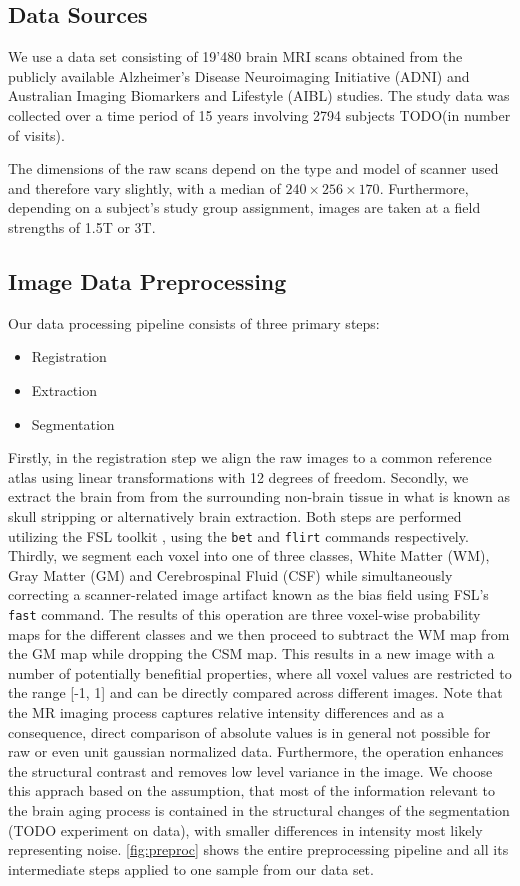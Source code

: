 \subsection{Data Sources}
We use a data set consisting of 19'480 brain MRI scans obtained from the publicly available Alzheimer's Disease Neuroimaging Initiative (ADNI) \cite{ADNI} and Australian Imaging Biomarkers and Lifestyle (AIBL) \cite{AIBL} studies. The study data was collected over a time period of 15 years involving 2794 subjects TODO(in number of visits).

The dimensions of the raw scans depend on the type and model of scanner used and therefore vary slightly, with a median of $ 240 \times 256 \times 170 $. Furthermore, depending on a subject's study group assignment, images are taken at a field strengths of 1.5T or 3T.
\subsection{Image Data Preprocessing}
Our data processing pipeline consists of three primary steps:

\begin{itemize}
\item Registration
\item Extraction
\item Segmentation
\end{itemize}

Firstly, in the registration step we align the raw images to a common reference atlas using linear transformations with 12 degrees of freedom. Secondly, we extract the brain from from the surrounding non-brain tissue in what is known as skull stripping or alternatively brain extraction. Both steps are performed utilizing the FSL toolkit \cite{FSL}, using the \texttt{bet} and \texttt{flirt} commands respectively. Thirdly, we segment each voxel into one of three classes, White Matter (WM), Gray Matter (GM) and Cerebrospinal Fluid (CSF) while simultaneously correcting a scanner-related image artifact known as the bias field using FSL's \texttt{fast} command. The results of this operation are three voxel-wise probability maps for the different classes and we then proceed to subtract the WM map from the GM map while dropping the CSM map. This results in a new image with a number of potentially benefitial properties, where all voxel values are restricted to the range [-1, 1] and can be directly compared across different images. Note that the MR imaging process captures relative intensity differences and as a consequence, direct comparison of absolute values is in general not possible for raw or even unit gaussian normalized data. Furthermore, the operation enhances the structural contrast and removes low level variance in the image. We choose this apprach based on the assumption, that most of the information relevant to the brain aging process is contained in the structural changes of the segmentation (TODO experiment on data), with smaller differences in intensity most likely representing noise. \autoref{fig:preproc} shows the entire preprocessing pipeline and all its intermediate steps applied to one sample from our data set.

